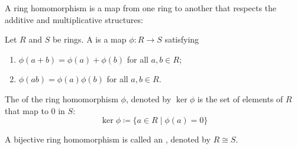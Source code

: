 \begin{example}

\end{example}

\begin{example}

\end{example}

\begin{example}

\end{example}

\begin{example}

\end{example}

A ring homomorphism is a map from one ring to another that respects the additive and multiplicative structures:

\begin{definition}
Let $R$ and $S$ be rings. A  is a map $\phi:R\to S$ satisfying
\begin{enumerate}[label=(\roman*)]
\item $\phi(a+b)=\phi(a)+\phi(b)$ for all $a,b\in R$;
\item $\phi(ab)=\phi(a)\phi(b)$ for all $a,b\in R$.
\end{enumerate}
\end{definition}

\begin{definition}
The  of the ring homomorphism $\phi$, denoted by $\ker\phi$ is the set of elements of $R$ that map to $0$ in $S$:
\[\ker\phi\coloneqq\{a\in R\mid\phi(a)=0\}\]
\end{definition}

\begin{definition}[Isomorphism]
A bijective ring homomorphism is called an , denoted by $R\cong S$.
\end{definition}

